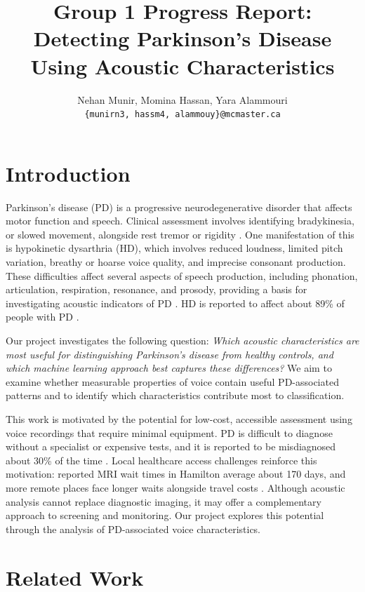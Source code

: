 \documentclass[11pt]{article}
\title{Group 1 Progress Report:\\Detecting Parkinson's Disease Using Acoustic Characteristics}
\author{Nehan Munir,  Momina Hassan, Yara Alammouri \\
  \texttt{\{munirn3, hassm4, alammouy\}@mcmaster.ca} }
\begin{document}
\maketitle

\section{Introduction}

Parkinson's disease (PD) is a progressive neurodegenerative disorder that affects motor
function and speech. Clinical assessment involves identifying bradykinesia, or slowed
movement, alongside rest tremor or rigidity \citep{Postuma:15}. One manifestation of this
is hypokinetic dysarthria (HD), which involves reduced loudness, limited pitch variation,
breathy or hoarse voice quality, and imprecise consonant production. These difficulties
affect several aspects of speech production, including phonation, articulation,
respiration, resonance, and prosody, providing a basis for investigating acoustic
indicators of PD \citep{atalar-oguz-genc-2023}. HD is reported to affect about 89\% of
people with PD \citep{Byatt2025}.

Our project investigates the following question:
\textit{Which acoustic characteristics are most useful for distinguishing Parkinson's
disease from healthy controls, and which machine learning approach best captures these
differences?} We aim to examine whether measurable properties of voice contain useful
PD-associated patterns and to identify which characteristics contribute most to
classification.

This work is motivated by the potential for low-cost, accessible assessment using voice
recordings that require minimal equipment. PD is difficult to diagnose without a
specialist or expensive tests, and it is reported to be misdiagnosed about 30\% of the
time \citep{PRO2020}. Local healthcare access challenges reinforce this motivation:
reported MRI wait times in Hamilton average about 170 days, and more remote places face
longer waits alongside travel costs \citep{OntarioHealth2026}. Although acoustic analysis
cannot replace diagnostic imaging, it may offer a complementary approach to screening and
monitoring. Our project explores this potential through the analysis of PD-associated
voice characteristics.

\section{Related Work}
\end{document}
